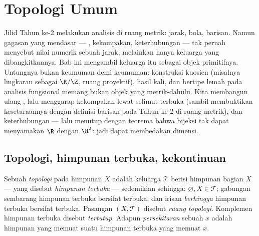 \chapter{Topologi Umum}\label{ch:b3:topology}

Jilid Tahun ke-2 melakukan analisis di ruang metrik: jarak,
bola, barisan. Namun gagasan yang mendasar --- ,
kekompakan, keterhubungan --- tak pernah menyebut nilai numerik
sebuah jarak, melainkan hanya keluarga \emph{} yang dibangkitkannya.
Bab ini mengambil keluarga itu sebagai objek primitifnya. Untungnya
bukan keumuman demi keumuman: konstruksi kuosien (misalnya
lingkaran sebagai $\R/\Z$, ruang proyektif), hasil kali, dan
 bertipe lemah pada analisis fungsional memang bukan
objek yang metrik-dahulu. Kita membangun ulang , lalu menggarap
kekompakan lewat selimut terbuka (sambil membuktikan kesetaraannya dengan
definisi barisan pada Tahun ke-2 di ruang metrik), dan keterhubungan ---
lalu menutup dengan teorema bahwa bijeksi  tak dapat
menyamakan $\R$ dengan $\R^2$: jadi  dapat membedakan dimensi.

\section{Topologi, himpunan terbuka, kekontinuan}

\begin{definition}\label{def:b3:topology:topology}
Sebuah \emph{topologi} pada himpunan $X$ adalah keluarga
$\mathcal T$ berisi himpunan bagian $X$ --- yang disebut \emph{himpunan
terbuka} --- sedemikian sehingga: $\varnothing, X \in
\mathcal T$; gabungan sembarang himpunan terbuka bersifat terbuka; dan irisan
\emph{berhingga} himpunan terbuka bersifat terbuka. Pasangan $(X, \mathcal T)$ disebut
\emph{ruang topologi}. Komplemen himpunan terbuka disebut
\emph{tertutup}. Adapun \emph{persekitaran} sebuah $x$
adalah himpunan yang memuat suatu himpunan terbuka yang memuat $x$.
\end{definition}

